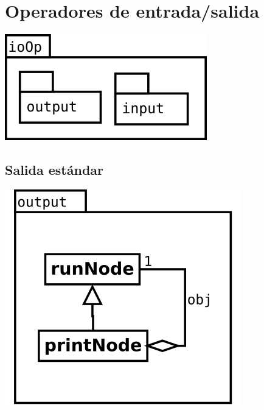 \pagebreak
\section {Operadores de entrada/salida} 
\begin{center}
\includegraphics[scale=0.4]{ioOp-package.png} \\
\end{center}
\subsection {Salida estándar} 
\begin{center}
\includegraphics[scale=0.4]{output.png} \\
\end{center}
